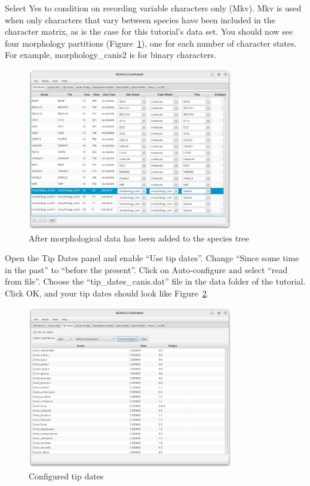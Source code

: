 \documentclass[12pt]{article}
\begin{document}
Select Yes to condition on recording variable characters only (Mkv). Mkv is
used when only characters that vary between species have been included in the
character matrix, as is the case for this tutorial's data set. You
should now see four morphology partitions
(Figure~\ref{fig:morphologyPartitions}), one for each number of character
states. For example, morphology\_canis2 is for binary characters.

\begin{figure}[htb!]
\centering
\includegraphics[width=0.8\textwidth]{figures/morphologyPartitions.png}
\caption
{After morphological data has been added to the species tree}
\label{fig:morphologyPartitions}
\end{figure}

Open the Tip Dates panel and enable ``Use tip dates''. Change
``Since some time in the past'' to ``before the present''. Click
on Auto-configure and select ``read from file''. Choose the
``tip\_dates\_canis.dat'' file in the data folder of the tutorial.
Click OK, and your tip dates should look like Figure~\ref{fig:tipDates}.

\begin{figure}[htb!]
\centering
\includegraphics[width=0.8\textwidth]{figures/tipDates.png}
\caption
{Configured tip dates}
\label{fig:tipDates}
\end{figure}
\end{document}
